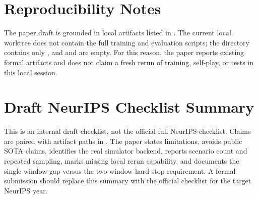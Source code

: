 \documentclass{article}
\begin{document}
\section*{Reproducibility Notes}

The paper draft is grounded in local artifacts listed in . The current local worktree does not contain the full training and evaluation scripts; the  directory contains only , and  and  are empty. For this reason, the paper reports existing formal artifacts and does not claim a fresh rerun of training, self-play, or tests in this local session.




\appendix
\section{Draft NeurIPS Checklist Summary}

This is an internal draft checklist, not the official full NeurIPS checklist. Claims are paired with artifact paths in . The paper states limitations, avoids public SOTA claims, identifies the real simulator backend, reports scenario count and repeated sampling, marks missing local rerun capability, and documents the single-window gap versus the two-window hard-stop requirement. A formal submission should replace this summary with the official checklist for the target NeurIPS year.
\end{document}
